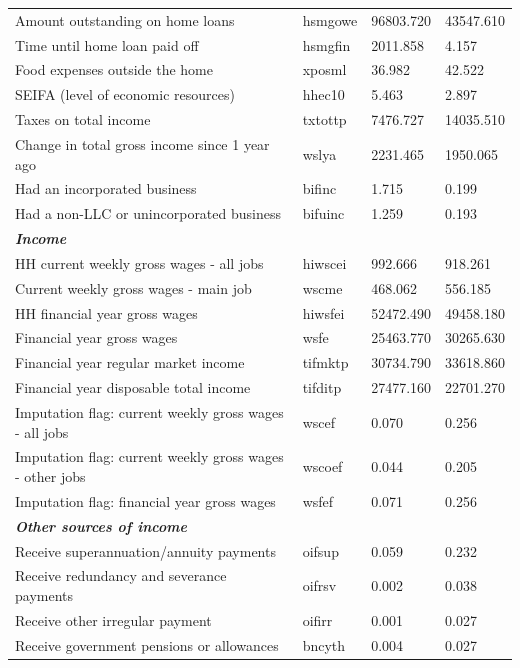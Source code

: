 \documentclass[12pt, a4paper]{article}
\begin{document}
\begin{longtable}{p{} C{0.15\textwidth} C{0.15\textwidth} C{0.15\textwidth}}
Amount outstanding on home loans 	& 	hsmgowe	 & 	96803.720	 & 	43547.610	 \\
Time until home loan paid off	& 	hsmgfin	 & 	2011.858	 & 	4.157	 \\
Food expenses outside the home 	& 	xposml	 & 	36.982	 & 	42.522	 \\
SEIFA (level of economic resources) 	& 	hhec10	 & 	5.463	 & 	2.897	 \\
Taxes on total income 	& 	txtottp	 & 	7476.727	 & 	14035.510	 \\
Change in total gross income since 1 year ago 	& 	wslya	 & 	2231.465	 & 	1950.065	 \\
Had an incorporated business 	& 	bifinc	 & 	1.715	 & 	0.199	 \\
Had a non-LLC or unincorporated business 	& 	bifuinc	 & 	1.259	 & 	0.193	 \\
\textbf{\textit{Income}} 	& 		 & 		 & 		 \\
HH current weekly gross wages - all jobs 	& 	hiwscei	 & 	992.666	 & 	918.261	 \\
Current weekly gross wages - main job 	& 	wscme	 & 	468.062	 & 	556.185	 \\
HH financial year gross wages 	& 	hiwsfei	 & 	52472.490	 & 	49458.180	 \\
Financial year gross wages 	& 	wsfe	 & 	25463.770	 & 	30265.630	 \\
Financial year regular market income	& 	tifmktp	 & 	30734.790	 & 	33618.860	 \\
Financial year disposable total income 	& 	tifditp	 & 	27477.160	 & 	22701.270	 \\
Imputation flag: current weekly gross wages - all jobs 	& 	wscef	 & 	0.070	 & 	0.256	 \\
Imputation flag: current weekly gross wages - other jobs 	& 	wscoef	 & 	0.044	 & 	0.205	 \\
Imputation flag: financial year gross wages 	& 	wsfef	 & 	0.071	 & 	0.256	 \\
\textbf{\textit{Other sources of income}} 	& 		 & 		 & 		 \\
Receive superannuation/annuity payments 	& 	oifsup	 & 	0.059	 & 	0.232	 \\
Receive redundancy and severance payments 	& 	oifrsv	 & 	0.002	 & 	0.038	 \\
Receive other irregular payment 	& 	oifirr	 & 	0.001	 & 	0.027	 \\
Receive government pensions or allowances 	& 	bncyth	 & 	0.004	 & 	0.027	 \\

\end{longtable}
\end{document}
